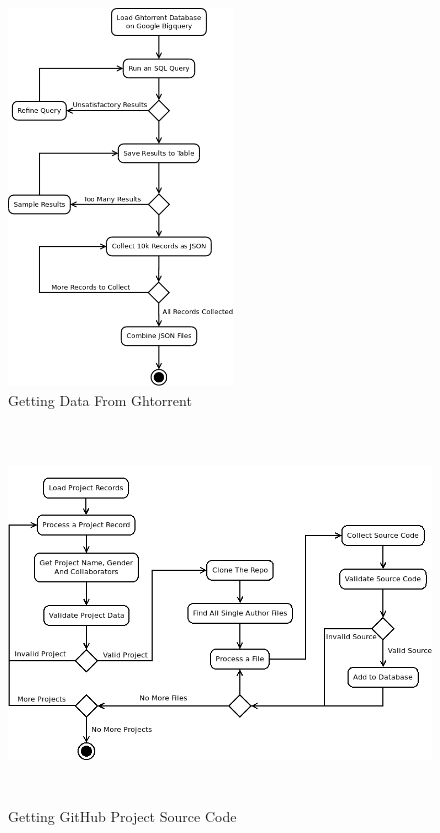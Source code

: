 \documentclass{article}
\begin{document}
\begin{figure}[!h]
    \centering
    \includegraphics[height=10cm]{diagrams/ght_process.png}
    \caption{Getting Data From Ghtorrent}
\end{figure}

\begin{figure}[!h]
    \centering
    \includegraphics[height=10cm]{diagrams/projects.png}
    \caption{Getting GitHub Project Source Code}
\end{figure}
\end{document}
